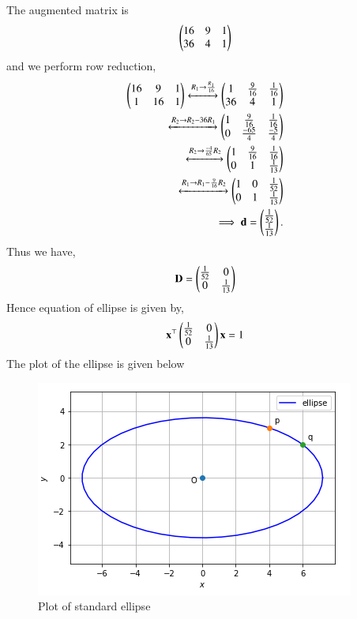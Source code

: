 \documentclass[journal,12pt,twocolumn]{IEEEtran}
\begin{document}
The augmented matrix is 
\begin{align}
\begin{pmatrix}16 & 9 & 1 \\ 36 & 4 & 1 \end{pmatrix}
\end{align}
and we perform row reduction,
\begin{align}
\begin{pmatrix}16 & 9 & 1\\ 1 & 16 & 1\end{pmatrix} 
\xleftrightarrow{R_1\rightarrow \frac{R_1}{16}}
\begin{pmatrix}1 & \frac{9}{16} & \frac{1}{16} \\ 36 & 4 & 1\end{pmatrix} 
\\
\xleftrightarrow{R_2\rightarrow R_2-36R_1}
\begin{pmatrix}1 & \frac{9}{16} & \frac{1}{16} \\ 0 & \frac{-65}{4} & \frac{-5}{4}\end{pmatrix} 
\\
\xleftrightarrow{R_2\rightarrow \frac{-4}{65}R_2}
\begin{pmatrix}1 & \frac{9}{16} & \frac{1}{16} \\ 0 & 1 & \frac{1}{13}\end{pmatrix}
\\
\xleftrightarrow{R_1\rightarrow R_1-\frac{9}{16}R_2}
\begin{pmatrix}1 & 0 & \frac{1}{52} \\ 0 & 1 & \frac{1}{13}\end{pmatrix}
\\
\implies \mathbf{d} = \begin{pmatrix}\frac{1}{52} \\ \frac{1}{13}\end{pmatrix}.
\end{align}
Thus we have,
\begin{align}
    \mathbf{D} = \begin{pmatrix}\frac{1}{52} & 0 \\ 0 & \frac{1}{13}\end{pmatrix}
\end{align}
Hence equation of ellipse is given by,
\begin{align}
\mathbf{x}^{\top}\begin{pmatrix}\frac{1}{52} & 0 \\ 0 & \frac{1}{13}\end{pmatrix}\mathbf{x} = 1
\end{align}
The plot of the ellipse is given below
\begin{figure}[ht]
\centering
\includegraphics[width=\columnwidth]{ellipse(1).PNG}
\caption{Plot of standard ellipse}
\label{Plot of standard ellipse}
\end{figure}
\end{document}
